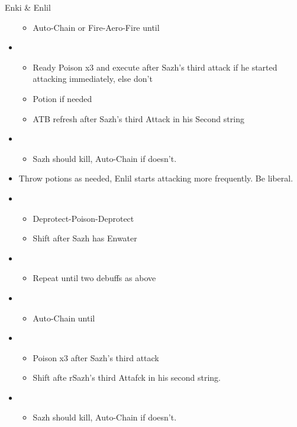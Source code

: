 \begin{battle}[1:41]{Enki \& Enlil}
\begin{itemize}
\begin{itemize}
				      \item Auto-Chain or Fire-Aero-Fire until \stagger
			      \end{itemize}
			\item \sixth
			      \begin{itemize}
				      \item Ready Poison x3 and execute after Sazh's third attack if he started attacking immediately, else don't
				      \item Potion if needed
				      \item ATB refresh after Sazh's third Attack in his Second string
			      \end{itemize}
			\item \first
			      \begin{itemize}
				      \item Sazh should kill, Auto-Chain if doesn't.
			      \end{itemize}
			\item Throw potions as needed, Enlil starts attacking more frequently. Be liberal.
			\item \third
			      \begin{itemize}
				      \item Deprotect-Poison-Deprotect
				      \item Shift after Sazh has Enwater
			      \end{itemize}
			\item \fifth
			      \begin{itemize}
				      \item Repeat until two debuffs as above
			      \end{itemize}
			\item \fourth
			      \begin{itemize}
				      \item Auto-Chain until \stagger
			      \end{itemize}
			\item \sixth
			      \begin{itemize}
				      \item Poison x3 after Sazh's third attack
				      \item Shift afte rSazh's third Attafck in his second string.
			      \end{itemize}
			\item \first
			      \begin{itemize}
				      \item Sazh should kill, Auto-Chain if doesn't.
			      \end{itemize}
		\end{itemize}
\end{battle}
